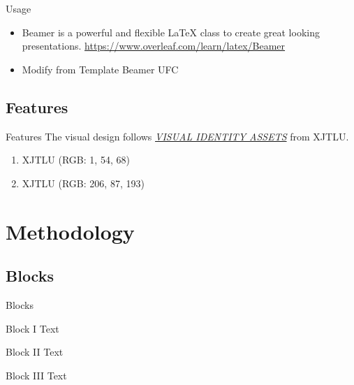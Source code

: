 \documentclass{libs/XJTLU_format}
\begin{document}
\begin{frame}{Usage}
    \begin{itemize}
        \item Beamer is a powerful and flexible \LaTeX{} class to create great looking presentations.   \url{https://www.overleaf.com/learn/latex/Beamer}
        \item Modify from Template Beamer UFC \cite{origin}
    \end{itemize}
\end{frame}

\subsection{Features}

\begin{frame}{Features}
	The visual design follows \href{https://www.xjtlu.edu.cn/en/about/professional-services/centre-for-knowledge-and-information/university-marketing-and-communications/visual-identity-assets}{\emph{VISUAL IDENTITY ASSETS}} from XJTLU.
    \begin{enumerate}
        \item {XJTLU  (RGB: 1, 54, 68)}
        \item {XJTLU  (RGB: 206, 87, 193)}
    \end{enumerate}
\end{frame}


\section{Methodology}

\subsection{Blocks}
\begin{frame}{Blocks}
    \begin{block}{Block I}
        Text
    \end{block}

    \begin{alertblock}{Block II}
        Text
    \end{alertblock}

    \begin{exampleblock}{Block III}
        Text
    \end{exampleblock}  
    
 
\end{frame}
\end{document}
